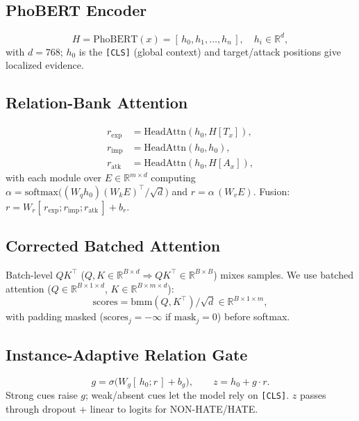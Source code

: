 \documentclass[11pt]{article}
\begin{document}
\subsection{PhoBERT Encoder}
\begin{equation}
  H = \mathrm{PhoBERT}(x) = [\,h_0, h_1, \dots, h_n\,], \quad h_i \in \mathbb{R}^{d},
\end{equation}
with $d=768$; $h_0$ is the \texttt{[CLS]} (global context) and target/attack positions give localized evidence.

\subsection{Relation-Bank Attention}
\begin{align}
  r_{\mathrm{exp}} &= \mathrm{HeadAttn}(h_0, H[T_x]), \nonumber\\
  r_{\mathrm{imp}} &= \mathrm{HeadAttn}(h_0, h_0), \\
  r_{\mathrm{atk}} &= \mathrm{HeadAttn}(h_0, H[A_x]), \nonumber
\end{align}
with each module over $E \in \mathbb{R}^{m\times d}$ computing $\alpha = \mathrm{softmax}\!\big((W_q h_0)(W_k E)^\top/\sqrt d\big)$ and $r = \alpha\,(W_v E)$. Fusion: $r = W_r[\,r_{\mathrm{exp}};r_{\mathrm{imp}};r_{\mathrm{atk}}\,] + b_r$.

\subsection{Corrected Batched Attention}
Batch-level $QK^\top$ ($Q,K\in\mathbb{R}^{B\times d}\Rightarrow QK^\top\in\mathbb{R}^{B\times B}$) mixes samples. We use batched attention ($Q\in\mathbb{R}^{B\times 1\times d}$, $K\in\mathbb{R}^{B\times m\times d}$):
\begin{equation}
  \mathrm{scores} = \mathrm{bmm}(Q,K^\top)/\sqrt d \in\mathbb{R}^{B\times1\times m},
\end{equation}
with padding masked ($\mathrm{scores}_j=-\infty$ if $\mathrm{mask}_j=0$) before softmax.

\subsection{Instance-Adaptive Relation Gate}
\begin{equation}
  g = \sigma\big(W_g[\,h_0;r\,] + b_g\big),\qquad z = h_0 + g\cdot r.
\end{equation}
Strong cues raise $g$; weak/absent cues let the model rely on \texttt{[CLS]}. $z$ passes through dropout + linear to logits for NON-HATE/HATE.
\end{document}
